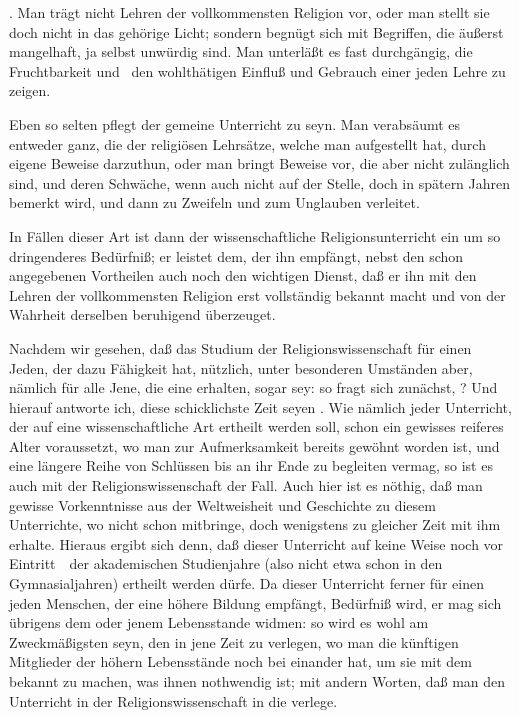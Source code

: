 \begin{aufza}
\begin{aufzb}
\item {}. Man trägt nicht  Lehren der vollkommensten Religion vor, oder man stellt sie doch nicht in das gehörige Licht; sondern begnügt sich mit Begriffen, die äußerst mangelhaft, ja selbst unwürdig sind. Man unterläßt es fast durchgängig, die Fruchtbarkeit und~ den wohlthätigen Einfluß und Gebrauch einer jeden Lehre zu zeigen.
\item Eben so selten pflegt der gemeine Unterricht  zu seyn. Man verabsäumt es entweder ganz, die  der religiösen Lehrsätze, welche man aufgestellt hat, durch eigene Beweise darzuthun, oder man bringt Beweise vor, die aber nicht zulänglich sind, und deren Schwäche, wenn auch nicht auf der Stelle, doch in spätern Jahren bemerkt wird, und dann zu Zweifeln und zum Unglauben verleitet.
\end{aufzb}
In Fällen dieser Art ist dann der wissenschaftliche Religionsunterricht ein um so dringenderes Bedürfniß; er leistet dem, der ihn empfängt, nebst den schon angegebenen Vortheilen auch noch den wichtigen Dienst, daß er ihn mit den Lehren der vollkommensten Religion erst vollständig bekannt macht und von der Wahrheit derselben beruhigend überzeuget.
\end{aufza}

Nachdem wir gesehen, daß das Studium der Religionswissenschaft für einen Jeden, der dazu Fähigkeit hat, nützlich, unter besonderen Umständen aber, nämlich für alle Jene, die eine  erhalten, sogar  sey: so fragt sich zunächst, ? Und hierauf antworte ich, diese schicklichste Zeit seyen . Wie nämlich jeder Unterricht, der auf eine wissenschaftliche Art ertheilt werden soll, schon ein gewisses reiferes Alter voraussetzt, wo man zur Aufmerksamkeit bereits gewöhnt worden ist, und eine längere Reihe von Schlüssen bis an ihr Ende zu begleiten vermag, so ist es auch mit der Religionswissenschaft der Fall. Auch hier ist es nöthig, daß man gewisse Vorkenntnisse aus der Weltweisheit und Geschichte zu diesem Unterrichte, wo nicht schon mitbringe, doch wenigstens zu gleicher Zeit mit ihm erhalte. Hieraus ergibt sich denn, daß dieser Unterricht auf keine Weise noch vor Eintritt~\ der akademischen Studienjahre (also nicht etwa schon in den Gymnasialjahren) ertheilt werden dürfe. Da dieser Unterricht ferner für einen jeden Menschen, der eine höhere Bildung empfängt, Bedürfniß wird, er mag sich übrigens dem oder jenem Lebensstande widmen: so wird es wohl am Zweckmäßigsten seyn, den  in jene Zeit zu verlegen, wo man die künftigen Mitglieder der höhern Lebensstände noch  bei einander hat, um sie mit dem bekannt zu machen, was ihnen  nothwendig ist; mit andern Worten, daß man den Unterricht in der Religionswissenschaft in die  verlege.

